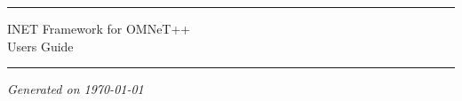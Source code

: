 

\begin{center}\end{center}
\vspace{16em}
\hrule
\vspace{2em}
\begin{center}
{\LARGE INET Framework for OMNeT++}\\
\vspace{1em}
{\large Users Guide}\\
\end{center}
\vspace{2em}
\hrule


\vspace{8em}

\begin{center}
\textit{Generated on \today}
\end{center}



